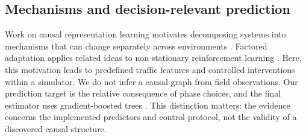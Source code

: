\subsection{Mechanisms and decision-relevant prediction}
Work on causal representation learning motivates decomposing systems into mechanisms that can change separately across environments \cite{bengio2019meta,scholkopf2021causal}. Factored adaptation applies related ideas to non-stationary reinforcement learning \cite{feng2022factored}. Here, this motivation leads to predefined traffic features and controlled interventions within a simulator. We do not infer a causal graph from field observations. Our prediction target is the relative consequence of phase choices, and the final estimator uses gradient-boosted trees \cite{friedman2001greedy,pedregosa2011scikit}. This distinction matters: the evidence concerns the implemented predictors and control protocol, not the validity of a discovered causal structure.
